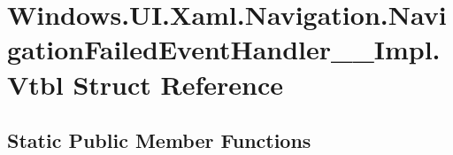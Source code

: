\hypertarget{struct_windows_1_1_u_i_1_1_xaml_1_1_navigation_1_1_navigation_failed_event_handler_____impl_1_1_vtbl}{}\section{Windows.\+U\+I.\+Xaml.\+Navigation.\+Navigation\+Failed\+Event\+Handler\+\_\+\+\_\+\+Impl.\+Vtbl Struct Reference}
\label{struct_windows_1_1_u_i_1_1_xaml_1_1_navigation_1_1_navigation_failed_event_handler_____impl_1_1_vtbl}
\subsection*{Static Public Member Functions}
